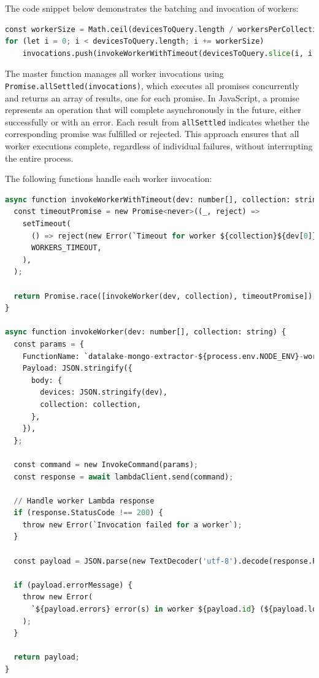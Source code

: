 The code snippet below demonstrates the batching and invocation of workers:
    \begin{lstlisting}[language=Python, caption=Device batching]
const workerSize = Math.ceil(devicesToQuery.length / workersPerCollection[operationalMode][collection])
for (let i = 0; i < devicesToQuery.length; i += workerSize)
    invocations.push(invokeWorkerWithTimeout(devicesToQuery.slice(i, i + workerSize), collection))
\end{lstlisting}

The master function manages all worker invocations using \\ \texttt{Promise.allSettled(invocations)}, which executes all promises concurrently and returns an array of results, one for each promise. In JavaScript, a promise represents an operation that will complete asynchronously in the future, either successfully or with an error. Each result from \texttt{allSettled} indicates whether the corresponding promise was fulfilled or rejected. This approach ensures that all worker executions complete, regardless of individual failures, without interrupting the entire process.

The following functions handle each worker invocation:

\begin{lstlisting}[language=Python, caption=\texttt{invokeWorkerWithTimeout} and \texttt{invokeWorker} functions]
async function invokeWorkerWithTimeout(dev: number[], collection: string) {
  const timeoutPromise = new Promise<never>((_, reject) =>
    setTimeout(
      () => reject(new Error(`Timeout for worker ${collection}${dev[0]}`)),
      WORKERS_TIMEOUT,
    ),
  );

  return Promise.race([invokeWorker(dev, collection), timeoutPromise]);
}

async function invokeWorker(dev: number[], collection: string) {
  const params = {
    FunctionName: `datalake-mongo-extractor-${process.env.NODE_ENV}-worker`,
    Payload: JSON.stringify({
      body: {
        devices: JSON.stringify(dev),
        collection: collection,
      },
    }),
  };

  const command = new InvokeCommand(params);
  const response = await lambdaClient.send(command);

  // Handle worker Lambda response
  if (response.StatusCode !== 200) {
    throw new Error(`Invocation failed for a worker`);
  }

  const payload = JSON.parse(new TextDecoder('utf-8').decode(response.Payload));

  if (payload.errorMessage) {
    throw new Error(
      `${payload.errors} error(s) in worker ${payload.id} (${payload.log_stream_name})`,
    );
  }

  return payload;
}
\end{lstlisting}

